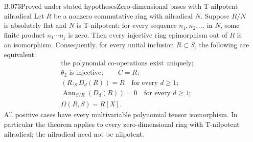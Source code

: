 \begin{saresult}{B.073}{Proved under stated hypotheses}{Zero-dimensional bases with T-nilpotent nilradical}
Let $R$ be a nonzero commutative ring with nilradical $N$. Suppose
$R/N$ is absolutely flat and $N$ is T-nilpotent: for every sequence
$n_1,n_2,\ldots$ in $N$, some finite product $n_1\cdots n_j$ is zero.
Then every injective ring epimorphism out of $R$ is an isomorphism.
Consequently, for every unital inclusion $R\subset S$, the following
are equivalent:
\[
\begin{gathered}
 \text{the polynomial co-operations exist uniquely};\\
 \theta_2\text{ is injective};\qquad C=R;\\
 (R:_S D_d(R))=R\quad\text{for every }d\ge1;\\
 \operatorname{Ann}_{S/R}(D_d(R))=0\quad\text{for every }d\ge1;\\
 \Omega(R,S)=R[X].                                       \tag{B73.1}
\end{gathered}
\]
All positive cases have every multivariable polynomial tensor
isomorphism. In particular the theorem applies to every zero-dimensional
ring with T-nilpotent nilradical; the nilradical need not be nilpotent.
\end{saresult}
